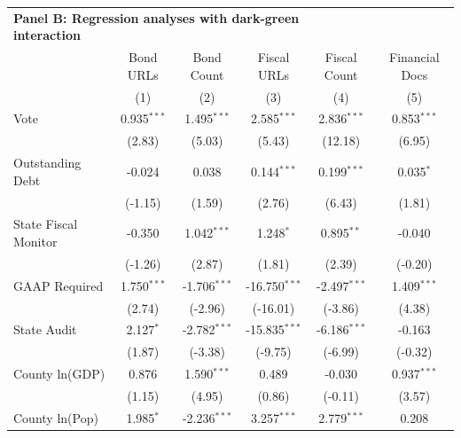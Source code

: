 \begingroup
\centering
\begin{tabular*}{\textwidth}{@{\extracolsep{\fill}}lccccc}
\multicolumn{5}{l}{\textbf{Panel B: Regression analyses with dark-green interaction}}\\

\addlinespace
   \toprule
                             & Bond URLs     & Bond Count     & Fiscal URLs     & Fiscal Count   & Financial Docs\\  
                             & (1)           & (2)            & (3)             & (4)            & (5)\\  
   \midrule 
   Vote                      & 0.935$^{***}$ & 1.495$^{***}$  & 2.585$^{***}$   & 2.836$^{***}$  & 0.853$^{***}$\\   
                             & (2.83)       & (5.03)        & (5.43)         & (12.18)       & (6.95)\\   
   Outstanding Debt          & -0.024        & 0.038          & 0.144$^{***}$   & 0.199$^{***}$  & 0.035$^{*}$\\   
                             & (-1.15)      & (1.59)        & (2.76)         & (6.43)        & (1.81)\\   
   State Fiscal Monitor      & -0.350        & 1.042$^{***}$  & 1.248$^{*}$     & 0.895$^{**}$   & -0.040\\   
                             & (-1.26)      & (2.87)        & (1.81)         & (2.39)        & (-0.20)\\   
   GAAP Required             & 1.750$^{***}$ & -1.706$^{***}$ & -16.750$^{***}$ & -2.497$^{***}$ & 1.409$^{***}$\\   
                             & (2.74)       & (-2.96)       & (-16.01)       & (-3.86)       & (4.38)\\   
   State Audit               & 2.127$^{*}$   & -2.782$^{***}$ & -15.835$^{***}$ & -6.186$^{***}$ & -0.163\\   
                             & (1.87)       & (-3.38)       & (-9.75)        & (-6.99)       & (-0.32)\\   
   County ln(GDP)            & 0.876         & 1.590$^{***}$  & 0.489           & -0.030         & 0.937$^{***}$\\   
                             & (1.15)       & (4.95)        & (0.86)         & (-0.11)       & (3.57)\\   
   County ln(Pop)            & 1.985$^{*}$   & -2.236$^{***}$ & 3.257$^{***}$   & 2.779$^{***}$  & 0.208\\   

\end{tabular*}

